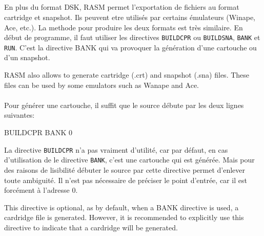 \subsection{}
\begin{xen}
\end{xen}
\begin{xfr}
\end{xfr}

\begin{xfr}
En plus du format DSK, RASM permet l'exportation de fichiers au format cartridge et snapshot. Ils peuvent etre utilisés par certains émulateurs (Winape, Ace, etc.). La methode pour produire les deux formats est très similaire. En début de programme, il faut utiliser les directives \texttt{BUILDCPR} ou \texttt{BUILDSNA}, \texttt{BANK} et \texttt{RUN}. C'est la directive BANK qui va provoquer la génération d'une cartouche ou d'un snapshot.
\end{xfr}

\begin{xen}
RASM also allows to generate cartridge (.crt) and snapshot (.sna) files. These files can be used by some emulators such as Wanape and Ace.
\end{xen}

\paragraph{}

\begin{xfr}
Pour générer une cartouche, il suffit que le source débute par les deux lignes suivantes:
\end{xfr}

\begin{code}
BUILDCPR
BANK 0
\end{code}

\begin{xfr}
La directive \texttt{BUILDCPR} n'a pas vraiment d'utilité, car par défaut, en cas d'utilisation de le directive \texttt{BANK}, c'est une cartouche qui est générée. Mais pour des raisons de lisibilité débuter le source par cette directive permet d'enlever toute ambiguité.
Il n'est pas nécessaire de préciser le point d'entrée, car il est forcément à l'adresse 0.
\end{xfr}

\begin{xen}
This directive is optional, as by default, when a BANK directive is used, a cardridge file is generated. However, it is recommended to explicitly use this directive to indicate that a cardridge will be generated.
\end{xen}

